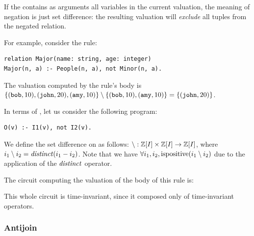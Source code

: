 If the  contains as arguments all variables in the current valuation,
the meaning of negation is just set difference: the resulting valuation
will \emph{exclude} all tuples from the negated relation.

For example, consider the rule:

\begin{lstlisting}[language=ddlog]
relation Major(name: string, age: integer)
Major(n, a) :- People(n, a), not Minor(n, a).
\end{lstlisting}

The valuation computed by the rule's body is $\{ (\mbox{\texttt{bob}}, 10), (\mbox{\texttt{john}}, 20), (\mbox{\texttt{amy}}, 10) \} 
\setminus \{ (\mbox{\texttt{bob}}, 10), (\mbox{\texttt{amy}}, 10) \} = \{ (\mbox{\texttt{john}}, 20) \}$.

In terms of \zrs, let us consider the following program:

\begin{lstlisting}[language=ddlog]
O(v) :- I1(v), not I2(v).     
\end{lstlisting}

We define the set difference on \zrs as follows: 
$\setminus: \mathbb{Z}[I] \times \mathbb{Z}[I] \rightarrow \mathbb{Z}[I]$, where $i_1
\setminus i_2 = \mathit{distinct}(i_1 - i_2)$.  Note
that we have $\forall i_1, i_2, \mbox{ispositive}(i_1 \setminus
i_2)$ due to the application of the $\mathit{distinct}$ operator.

The circuit computing the valuation of the body of this rule is:


This whole circuit is time-invariant, since it composed only of
time-invariant operators.

\subsubsection{Antijoin}\label{sec:antijoin}


